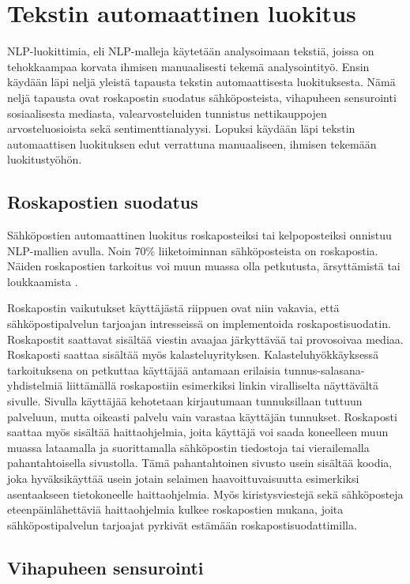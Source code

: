\chapter{Tekstin automaattinen luokitus\label{methods}}

NLP-luokittimia, eli NLP-malleja käytetään analysoimaan tekstiä, joissa on tehokkaampaa korvata ihmisen manuaalisesti tekemä analysointityö. Ensin käydään läpi neljä yleistä tapausta tekstin automaattisesta luokituksesta. Nämä neljä tapausta ovat roskapostin suodatus sähköposteista, vihapuheen sensurointi sosiaalisesta mediasta, valearvosteluiden tunnistus nettikauppojen arvosteluosioista sekä sentimenttianalyysi. Lopuksi käydään läpi tekstin automaattisen luokituksen edut verrattuna manuaaliseen, ihmisen tekemään luokitustyöhön.

\section{Roskapostien suodatus}

Sähköpostien automaattinen luokitus roskaposteiksi tai kelpoposteiksi onnistuu NLP-mal\-lien avulla. Noin 70\% liiketoiminnan sähköposteista on roskapostia. Näiden roskapostien tarkoitus voi muun muassa olla petkutusta, ärsyttämistä tai loukkaamista \citep{spam}.

Roskapostin vaikutukset käyttäjästä riippuen ovat niin vakavia, että sähköpostipalvelun tarjoajan intresseissä on implementoida roskapostisuodatin. Roskapostit saattavat sisältää viestin avaajaa järkyttävää tai provosoivaa mediaa. Roskaposti saattaa sisältää myös kalasteluyrityksen. Kalasteluhyökkäyksessä tarkoituksena on petkuttaa käyttäjää antamaan erilaisia tunnus-salasana-yhdistelmiä liittämällä roskapostiin esimerkiksi linkin viralliselta näyttävältä sivulle. Sivulla käyttäjää kehotetaan kirjautumaan tunnuksillaan tuttuun palveluun, mutta oikeasti palvelu vain varastaa käyttäjän tunnukset. Roskaposti saattaa myös sisältää haittaohjelmia, joita käyttäjä voi saada koneelleen muun muassa lataamalla ja suorittamalla sähköpostin tiedostoja tai vierailemalla pahantahtoisella sivustolla. Tämä pahantahtoinen sivusto usein sisältää koodia, joka hyväksikäyttää usein jotain selaimen haavoittuvaisuutta esimerkiksi asentaakseen tietokoneelle haittaohjelmia. Myös kiristysviestejä sekä sähköposteja eteenpäinlähettäviä haittaohjelmia kulkee roskapostien mukana, joita sähköpostipalvelun tarjoajat pyrkivät estämään roskapostisuodattimilla.

\section{Vihapuheen sensurointi}

